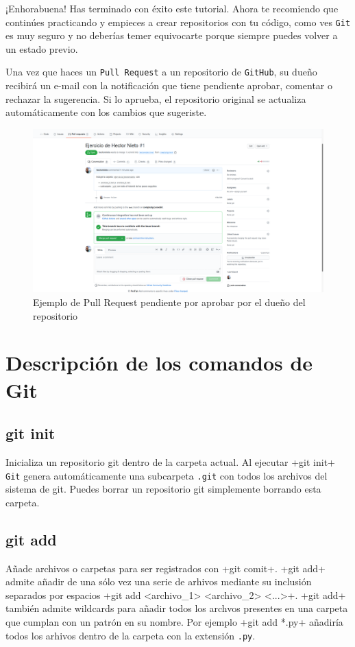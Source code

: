 \documentclass[a5paper,10pt]{article}
\begin{document}
    ¡Enhorabuena! Has terminado con éxito este tutorial. Ahora te recomiendo que continúes practicando y empieces a crear repositorios con tu código, como ves \verb+Git+ es muy seguro y no deberías temer equivocarte porque siempre puedes volver a un estado previo.
    
    Una vez que haces un \verb+Pull Request+ a un repositorio de \verb+GitHub+, su dueño recibirá un e-mail con la notificación que tiene pendiente aprobar, comentar o rechazar la sugerencia. Si lo aprueba, el repositorio original se actualiza automáticamente con los cambios que sugeriste.
    
     \begin{figure}[H]
      \hspace{-1cm}\includegraphics[width=1.6\columnwidth]{github_pending_pull_request}
      \caption{Ejemplo de Pull Request pendiente por aprobar por el dueño del repositorio}
     \end{figure}   
   

  \section{Descripción de los comandos de Git}
    \subsection{git init}
      Inicializa un repositorio git dentro de la carpeta actual. Al ejecutar \cverb+git init+ \verb+Git+ genera automáticamente una subcarpeta \verb+.git+ con todos los archivos del sistema de git. Puedes borrar un repositorio git simplemente borrando esta carpeta.
      
    \subsection{git add}
      Añade archivos o carpetas para ser registrados con \cverb+git comit+. \cverb+git add+ admite añadir de una sólo vez una serie de arhivos mediante su inclusión separados por espacios \cverb+git add <archivo_1> <archivo_2> <...>+. \cverb+git add+ también admite wildcards para añadir todos los archvos presentes en una carpeta que cumplan con un patrón en su nombre. Por ejemplo \cverb+git add *.py+ añadiría todos los arhivos dentro de la carpeta con la extensión \verb+.py+.
    
\end{document}
